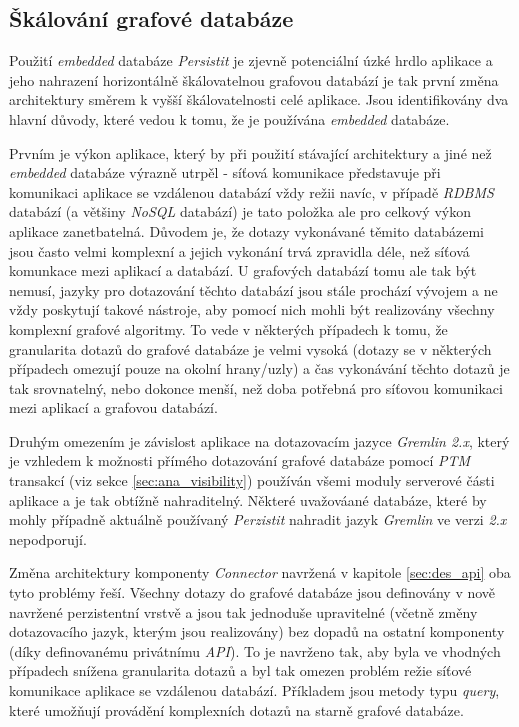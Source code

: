 \subsection{Škálování grafové databáze}
\label{sec:des_scaling_db}
Použití \textit{embedded} databáze \textit{Persistit} je zjevně potenciální úzké hrdlo aplikace a jeho nahrazení horizontálně škálovatelnou grafovou databází je tak první změna architektury směrem k vyšší škálovatelnosti celé aplikace. Jsou identifikovány dva hlavní důvody, které vedou k tomu, že je používána \textit{embedded} databáze.

Prvním je výkon aplikace, který by při použití stávající architektury a jiné než \textit{embedded} databáze výrazně utrpěl - síťová komunikace představuje při komunikaci aplikace se vzdálenou databází vždy režii navíc, v případě \textit{RDBMS} databází (a většiny \textit{NoSQL} databází) je tato položka ale pro celkový výkon aplikace zanetbatelná. Důvodem je, že dotazy vykonávané těmito databázemi jsou často velmi komplexní a jejich vykonání trvá zpravidla déle, než síťová komunkace mezi aplikací a databází. U grafových databází tomu ale tak být nemusí, jazyky pro dotazování těchto databází jsou stále prochází vývojem a ne vždy poskytují takové nástroje, aby pomocí nich mohli být realizovány všechny komplexní grafové algoritmy. To vede v některých případech k tomu, že granularita dotazů do grafové databáze je velmi vysoká (dotazy se v některých případech omezují pouze na okolní hrany/uzly) a čas vykonávání těchto dotazů je tak srovnatelný, nebo dokonce menší, než doba potřebná pro síťovou komunikaci mezi aplikací a grafovou databází.

Druhým omezením je závislost aplikace na dotazovacím jazyce \textit{Gremlin 2.x}, který je vzhledem k možnosti přímého dotazování grafové databáze pomocí \textit{PTM} transakcí (viz sekce \ref{sec:ana_visibility}) používán všemi moduly serverové části aplikace a je tak obtížně nahraditelný. Některé uvažováané databáze, které by mohly případně aktuálně používaný \textit{Perzistit} nahradit jazyk \textit{Gremlin} ve verzi \textit{2.x} nepodporují.

Změna architektury komponenty \textit{Connector} navržená v kapitole \ref{sec:des_api} oba tyto problémy řeší. Všechny dotazy do grafové databáze jsou definovány v nově navržené perzistentní vrstvě a jsou tak jednoduše upravitelné (včetně změny dotazovacího jazyk, kterým jsou realizovány) bez dopadů na ostatní komponenty (díky definovanému privátnímu \textit{API}). To je navrženo tak, aby byla ve vhodných případech snížena granularita dotazů a byl tak omezen problém režie síťové komunikace aplikace se vzdálenou databází. Příkladem jsou metody typu \textit{query}, které umožňují provádění komplexních dotazů na starně grafové databáze.

